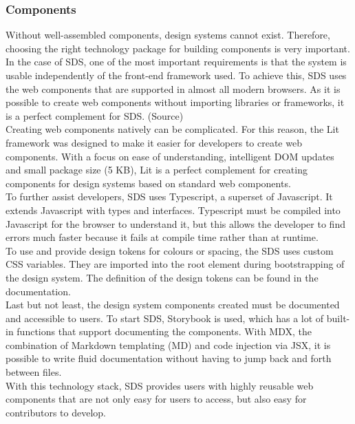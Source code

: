 \subsubsection*{Components} \label{sds-component}
Without well-assembled components, design systems cannot exist. Therefore, choosing the right technology package for building components is very important. 
In the case of SDS, one of the most important requirements is that the system is usable independently of the front-end framework used. To achieve this, SDS uses the web components that are supported in almost all modern browsers. As it is possible to create web components without importing libraries or frameworks, it is a perfect complement for SDS. (Source)\citep{component_definition} \\
Creating web components natively can be complicated. For this reason, the Lit framework was designed to make it easier for developers to create web components. With a focus on ease of understanding, intelligent DOM updates and small package size (5 KB), Lit is a perfect complement for creating components for design systems based on standard web components. \citep{component_definition} \\
To further assist developers, SDS uses Typescript, a superset of Javascript. It extends Javascript with types and interfaces. Typescript must be compiled into Javascript for the browser to understand it, but this allows the developer to find errors much faster because it fails at compile time rather than at runtime. \citep{component_definition} \\
To use and provide design tokens for colours or spacing, the SDS uses custom CSS variables. They are imported into the root element during bootstrapping of the design system. The definition of the design tokens can be found in the documentation. \citep{component_definition} \\
Last but not least, the design system components created must be documented and accessible to users. To start SDS, Storybook is used, which has a lot of built-in functions that support documenting the components. With MDX, the combination of Markdown templating (MD) and code injection via JSX, it is possible to write fluid documentation without having to jump back and forth between files. \citep{component_definition} \\
With this technology stack, SDS provides users with highly reusable web components that are not only easy for users to access, but also easy for contributors to develop. 
